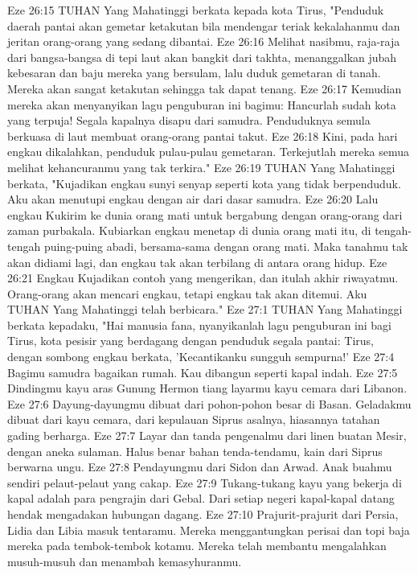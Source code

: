 Eze 26:15  TUHAN Yang Mahatinggi berkata kepada kota Tirus, "Penduduk daerah pantai akan gemetar ketakutan bila mendengar teriak kekalahanmu dan jeritan orang-orang yang sedang dibantai.
Eze 26:16  Melihat nasibmu, raja-raja dari bangsa-bangsa di tepi laut akan bangkit dari takhta, menanggalkan jubah kebesaran dan baju mereka yang bersulam, lalu duduk gemetaran di tanah. Mereka akan sangat ketakutan sehingga tak dapat tenang.
Eze 26:17  Kemudian mereka akan menyanyikan lagu penguburan ini bagimu: Hancurlah sudah kota yang terpuja! Segala kapalnya disapu dari samudra. Penduduknya semula berkuasa di laut membuat orang-orang pantai takut.
Eze 26:18  Kini, pada hari engkau dikalahkan, penduduk pulau-pulau gemetaran. Terkejutlah mereka semua melihat kehancuranmu yang tak terkira."
Eze 26:19  TUHAN Yang Mahatinggi berkata, "Kujadikan engkau sunyi senyap seperti kota yang tidak berpenduduk. Aku akan menutupi engkau dengan air dari dasar samudra.
Eze 26:20  Lalu engkau Kukirim ke dunia orang mati untuk bergabung dengan orang-orang dari zaman purbakala. Kubiarkan engkau menetap di dunia orang mati itu, di tengah-tengah puing-puing abadi, bersama-sama dengan orang mati. Maka tanahmu tak akan didiami lagi, dan engkau tak akan terbilang di antara orang hidup.
Eze 26:21  Engkau Kujadikan contoh yang mengerikan, dan itulah akhir riwayatmu. Orang-orang akan mencari engkau, tetapi engkau tak akan ditemui. Aku TUHAN Yang Mahatinggi telah berbicara."
Eze 27:1  TUHAN Yang Mahatinggi berkata kepadaku, "Hai manusia fana, nyanyikanlah lagu penguburan ini bagi Tirus, kota pesisir yang berdagang dengan penduduk segala pantai: Tirus, dengan sombong engkau berkata, 'Kecantikanku sungguh sempurna!'
Eze 27:4  Bagimu samudra bagaikan rumah. Kau dibangun seperti kapal indah.
Eze 27:5  Dindingmu kayu aras Gunung Hermon tiang layarmu kayu cemara dari Libanon.
Eze 27:6  Dayung-dayungmu dibuat dari pohon-pohon besar di Basan. Geladakmu dibuat dari kayu cemara, dari kepulauan Siprus asalnya, hiasannya tatahan gading berharga.
Eze 27:7  Layar dan tanda pengenalmu dari linen buatan Mesir, dengan aneka sulaman. Halus benar bahan tenda-tendamu, kain dari Siprus berwarna ungu.
Eze 27:8  Pendayungmu dari Sidon dan Arwad. Anak buahmu sendiri pelaut-pelaut yang cakap.
Eze 27:9  Tukang-tukang kayu yang bekerja di kapal adalah para pengrajin dari Gebal. Dari setiap negeri kapal-kapal datang hendak mengadakan hubungan dagang.
Eze 27:10  Prajurit-prajurit dari Persia, Lidia dan Libia masuk tentaramu. Mereka menggantungkan perisai dan topi baja mereka pada tembok-tembok kotamu. Mereka telah membantu mengalahkan musuh-musuh dan menambah kemasyhuranmu.
